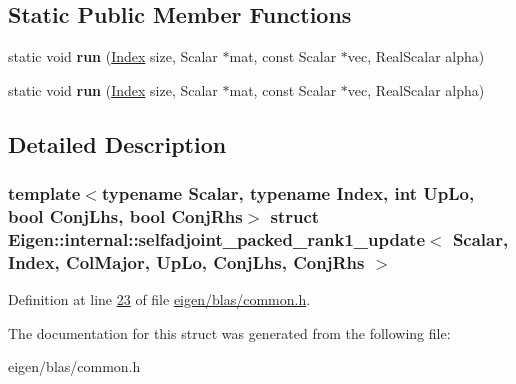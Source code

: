 \subsection*{Static Public Member Functions}
\begin{DoxyCompactItemize}
\item 
\mbox{\label{struct_eigen_1_1internal_1_1selfadjoint__packed__rank1__update_3_01_scalar_00_01_index_00_01_col211b56a6e7dbb087a746c109f1fd6193_aa4f86edce1646f91369615495e112965}} 
static void {\bfseries run} (\hyperlink{namespace_eigen_a62e77e0933482dafde8fe197d9a2cfde}{Index} size, Scalar $\ast$mat, const Scalar $\ast$vec, Real\+Scalar alpha)
\item 
\mbox{\label{struct_eigen_1_1internal_1_1selfadjoint__packed__rank1__update_3_01_scalar_00_01_index_00_01_col211b56a6e7dbb087a746c109f1fd6193_aa4f86edce1646f91369615495e112965}} 
static void {\bfseries run} (\hyperlink{namespace_eigen_a62e77e0933482dafde8fe197d9a2cfde}{Index} size, Scalar $\ast$mat, const Scalar $\ast$vec, Real\+Scalar alpha)
\end{DoxyCompactItemize}


\subsection{Detailed Description}
\subsubsection*{template$<$typename Scalar, typename Index, int Up\+Lo, bool Conj\+Lhs, bool Conj\+Rhs$>$\newline
struct Eigen\+::internal\+::selfadjoint\+\_\+packed\+\_\+rank1\+\_\+update$<$ Scalar, Index, Col\+Major, Up\+Lo, Conj\+Lhs, Conj\+Rhs $>$}



Definition at line \hyperlink{eigen_2blas_2common_8h_source_l00023}{23} of file \hyperlink{eigen_2blas_2common_8h_source}{eigen/blas/common.\+h}.



The documentation for this struct was generated from the following file\+:\begin{DoxyCompactItemize}
\item 
eigen/blas/common.\+h\end{DoxyCompactItemize}
